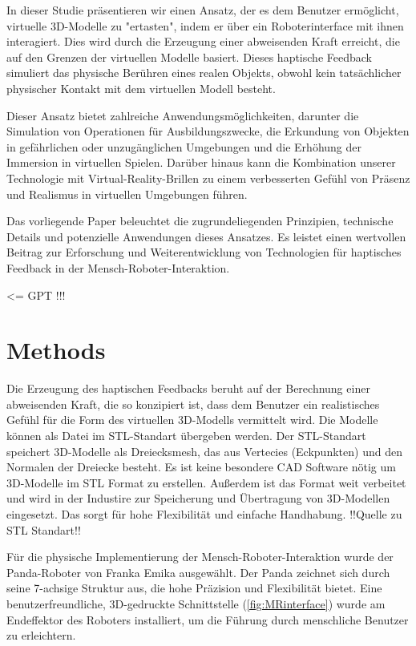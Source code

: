 \documentclass[conference]{IEEEtran}
\begin{document}
In dieser Studie präsentieren wir einen Ansatz, der es dem Benutzer ermöglicht, virtuelle 3D-Modelle zu "ertasten", indem er über ein Roboterinterface mit ihnen interagiert. Dies wird durch die Erzeugung einer abweisenden Kraft erreicht, die auf den Grenzen der virtuellen Modelle basiert. Dieses haptische Feedback simuliert das physische Berühren eines realen Objekts, obwohl kein tatsächlicher physischer Kontakt mit dem virtuellen Modell besteht. 

Dieser Ansatz bietet zahlreiche Anwendungsmöglichkeiten, darunter die Simulation von Operationen für Ausbildungszwecke, die Erkundung von Objekten in gefährlichen oder unzugänglichen Umgebungen und die Erhöhung der Immersion in virtuellen Spielen. Darüber hinaus kann die Kombination unserer Technologie mit Virtual-Reality-Brillen zu einem verbesserten Gefühl von Präsenz und Realismus in virtuellen Umgebungen führen.

Das vorliegende Paper beleuchtet die zugrundeliegenden Prinzipien, technische Details und potenzielle Anwendungen dieses Ansatzes. Es leistet einen wertvollen Beitrag zur Erforschung und Weiterentwicklung von Technologien für haptisches Feedback in der Mensch-Roboter-Interaktion.

<= GPT !!!

\section{Methods}
Die Erzeugung des haptischen Feedbacks beruht auf der Berechnung einer abweisenden Kraft, die so 
konzipiert ist, dass dem Benutzer ein realistisches Gefühl für die Form des virtuellen 
3D-Modells vermittelt wird. Die Modelle können als Datei im STL-Standart übergeben werden.
Der STL-Standart speichert 3D-Modelle als Dreiecksmesh, das aus Vertecies (Eckpunkten) und den 
Normalen der Dreiecke besteht. Es ist keine besondere CAD Software nötig um 3D-Modelle im STL 
Format zu erstellen. Außerdem ist das Format weit verbeitet und wird in der Industire zur
Speicherung und Übertragung von 3D-Modellen eingesetzt. Das sorgt für hohe Flexibilität 
und einfache Handhabung. !!Quelle zu STL Standart!!

Für die physische Implementierung der Mensch-Roboter-Interaktion wurde der Panda-Roboter von 
Franka Emika ausgewählt. Der Panda zeichnet sich durch seine 7-achsige Struktur aus, die hohe 
Präzision und Flexibilität bietet. Eine benutzerfreundliche, 3D-gedruckte Schnittstelle 
(\ref{fig:MRinterface}) wurde am Endeffektor des Roboters installiert, um die Führung durch 
menschliche Benutzer zu erleichtern.  
\end{document}
